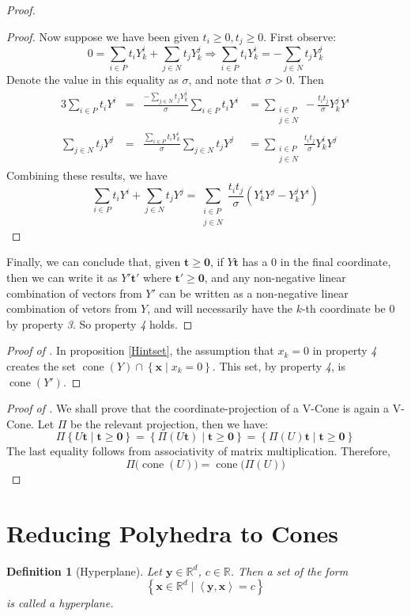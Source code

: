 \documentclass[fleqn]{article}
\renewcommand{\vec}[1]{\mathbf{#1}}
\newcommand{\set}[1]{\left\{#1\right\}}
\DeclareMathOperator{\cone}{cone}
\newcommand{\ip}[2]{\left\langle #1, #2 \right\rangle}
\newcommand{\R}{\mathbb{R}}
\newcommand{\0}{\vec{0}}
\newcommand{\x}{\vec{x}}
\newcommand{\y}{\vec{y}}
\renewcommand{\t}{\vec{t}}
\newcommand{\st}{\;|\;}
\newcommand{\xv}{\x \in \R^d}
\newcommand{\Yi}{Y^i_{k}}
\newcommand{\Yj}{Y^j_{k}}
\newcommand{\Psum}{\sum_{i\in P}}
\newcommand{\Nsum}{\sum_{j\in N}}
\newcommand{\NPsum}{\sum_{\substack{i\in P \\ j\in N}}}
\newtheorem{Def}{Definition}
\begin{document}
\begin{proof}
\begin{proof}
Now suppose we have been given $t_i \geq 0, t_j \geq 0$.  First observe:
\[ 0 = \Psum t_i\Yi + \Nsum t_j\Yj \Rightarrow \Psum t_i\Yi = -\Nsum t_j\Yj\]
Denote the value in this equality as $\sigma$, and note that $\sigma > 0$.  Then
\begin{alignat*}{3} 
\Psum t_i Y^i &= &\frac{-\Nsum t_j \Yj}{\sigma}\Psum t_i Y^i &= 
                     \NPsum -\frac{t_i t_j}{\sigma}\Yj Y^i \\
\Nsum t_j Y^j &= &\frac{\Psum t_i \Yi}{\sigma}\Nsum t_j Y^j &= 
                     \NPsum \frac{t_i t_j}{\sigma}\Yi Y^j
\end{alignat*}
Combining these results, we have
\[ \Psum t_i Y^i + \Nsum t_j Y^j = 
                     \NPsum \frac{t_i t_j}{\sigma}(\Yi Y^j - \Yj Y^i) \]
\end{proof}
Finally, we can conclude that, given $\t \geq \0$, if $ Y\t$ has a $0$ in the final coordinate, then we can write it as $ Y'\t'$ where $\t' \geq \0$, and any non-negative linear combination of vectors from $Y'$ can be written as a non-negative linear combination of vetors from $Y$, and will necessarily have the $k$-th coordinate be $0$ by property \textit{3}.  So property \textit{4} holds.
\end{proof}

\begin{proof}[Proof of {\Hint}]
In proposition \ref{Hintset}, the assumption that $x_k = 0$ in property \textit{4} creates the set $\cone(Y) \cap \set{\x \st x_k = 0}$.  This set, by property \textit{4}, is $\cone(Y')$.
\end{proof}

\begin{proof}[Proof of {\Hproj}]
  We shall prove that the coordinate-projection of a V-Cone is again a V-Cone.  Let $\Pi$ be the relevant projection, then we have:
  \[ \Pi\set{U\t \st \t \geq \0} = \set{\Pi(U\t) \st \t \geq \0} = 
        \set{\Pi(U)\t \st \t \geq \0} \]
The last equality follows from associativity of matrix multiplication.  Therefore,
  \[ \Pi\big(\cone(U)\big) = \cone\big(\Pi(U)\big) \]
\end{proof}

\section{Reducing Polyhedra to Cones}

\begin{Def}[Hyperplane]
  Let $\y \in \R^d$, $c \in \R$.  Then a set of the form
  \[ \set{\xv \st \ip{\y}{\x} = c} \]
  is called a \em{hyperplane}.
\end{Def}
\end{document}
